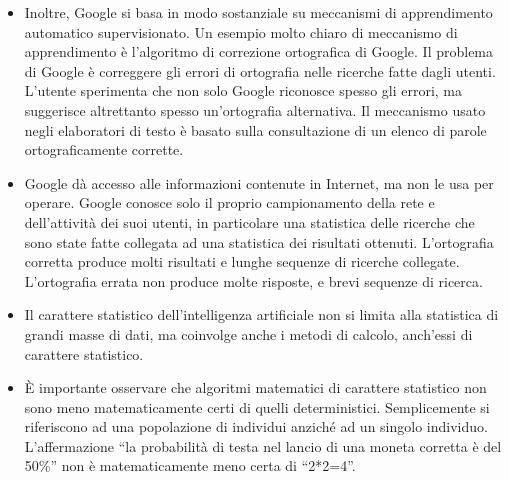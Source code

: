 \documentclass[xcolor=svgnames]{beamer}
\begin{document}
\begin{frame}
\begin{itemize}
\item Inoltre, Google si basa in modo sostanziale su meccanismi di apprendimento automatico supervisionato. Un esempio molto chiaro di meccanismo di apprendimento è l'algoritmo di correzione ortografica di Google. Il problema di Google è correggere gli errori di ortografia nelle ricerche fatte dagli utenti. L'utente sperimenta che non solo Google riconosce spesso gli errori, ma suggerisce altrettanto spesso un'ortografia alternativa. Il meccanismo usato negli elaboratori di testo è basato sulla consultazione di un elenco di parole ortograficamente corrette.
  \item Google dà accesso alle informazioni contenute in Internet, ma non le usa per operare. Google conosce solo il proprio campionamento della rete e dell'attività dei suoi utenti, in particolare una statistica delle ricerche che sono state fatte collegata ad una statistica dei risultati ottenuti. L'ortografia corretta produce molti risultati e lunghe sequenze di ricerche collegate. L'ortografia errata non produce molte risposte, e brevi sequenze di ricerca.
  \item Il carattere statistico dell'intelligenza artificiale non si limita alla statistica di grandi masse di dati, ma coinvolge anche i metodi di calcolo, anch'essi di carattere statistico.
  \item \`E importante osservare che algoritmi matematici di carattere statistico non sono meno matematicamente certi di quelli deterministici. Semplicemente si riferiscono ad una popolazione di individui anziché ad un singolo individuo. L'affermazione ``la probabilità di testa nel lancio di una moneta corretta è del 50\%'' non è matematicamente meno certa di ``2*2=4''.\end{itemize}
\end{frame}
\end{document}
